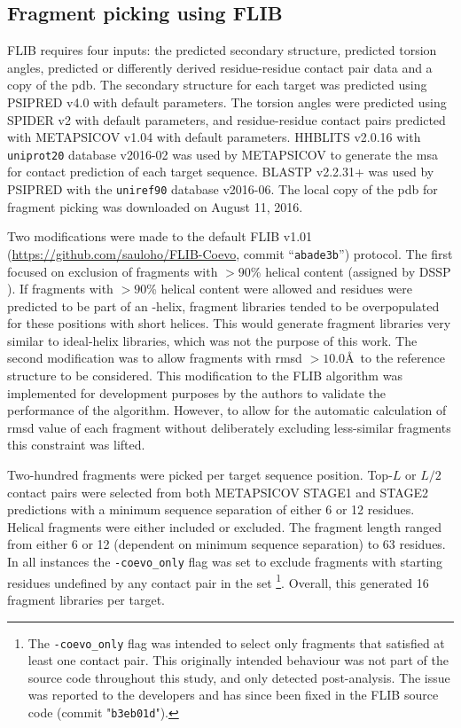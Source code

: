 \subsection{Fragment picking using FLIB}
FLIB \cite{De_Oliveira2015-kb} requires four inputs: the predicted secondary structure, predicted torsion angles, predicted or differently derived residue-residue contact pair data and a copy of the \gls{pdb}. The secondary structure for each target was predicted using PSIPRED v4.0 \cite{Jones1999-ed} with default parameters. The torsion angles were predicted using SPIDER v2 \cite{Heffernan2015-bt} with default parameters, and residue-residue contact pairs predicted with METAPSICOV v1.04 \cite{Jones2015-vq} with default parameters. HHBLITS v2.0.16 \cite{Remmert2011-kt} with \texttt{uniprot20} database v2016-02 was used by METAPSICOV to generate the \gls{msa} for contact prediction of each target sequence. BLASTP v2.2.31+ \cite{Altschul1990-og,Camacho2009-th} was used by PSIPRED with the \texttt{uniref90} database v2016-06. The local copy of the \gls{pdb} for fragment picking was downloaded on August 11, 2016.

Two modifications were made to the default FLIB v1.01 (\url{https://github.com/sauloho/FLIB-Coevo}, commit “\texttt{abade3b}”) protocol. The first focused on exclusion of fragments with $>90$\% helical content (assigned by DSSP \cite{Frishman1995-si}). If fragments with $>90$\% helical content were allowed and residues were predicted to be part of an \textalpha-helix, fragment libraries tended to be overpopulated for these positions with short helices. This would generate fragment libraries very similar to ideal-helix libraries, which was not the purpose of this work. The second modification was to allow fragments with \gls{rmsd} $>10.0$\AA\ to the reference structure to be considered. This modification to the FLIB algorithm was implemented for development purposes by the authors to validate the performance of the algorithm. However, to allow for the automatic calculation of \gls{rmsd} value of each fragment without deliberately excluding less-similar fragments this constraint was lifted.

Two-hundred fragments were picked per target sequence position. Top-$L$ or $L/2$ contact pairs were selected from both METAPSICOV STAGE1 and STAGE2 predictions with a minimum sequence separation of either 6 or 12 residues. Helical fragments were either included or excluded. The fragment length ranged from either 6 or 12 (dependent on minimum sequence separation) to 63 residues. In all instances the \texttt{-coevo\_only} flag was set to exclude fragments with starting residues undefined by any contact pair in the set \footnote{The \texttt{-coevo\_only} flag was intended to select only fragments that satisfied at least one contact pair. This originally intended behaviour was not part of the source code throughout this study, and only detected post-analysis. The issue was reported to the developers and has since been fixed in the FLIB source code (commit "\texttt{b3eb01d}").}. Overall, this generated 16 fragment libraries per target.

